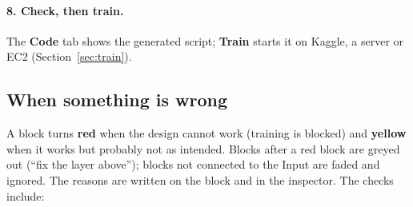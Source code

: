 \documentclass[11pt,a4paper]{article}
\newcommand{\ui}[1]{\textbf{\textsf{#1}}}
\begin{document}
\paragraph{8. Check, then train.}
The \ui{Code} tab shows the generated script; \ui{Train} starts it on Kaggle, a server or EC2 (Section~\ref{sec:train}).

\subsection{When something is wrong}
\label{sec:checks}
A block turns \textbf{red} when the design cannot work (training is blocked) and \textbf{yellow} when it works but probably not as
intended. Blocks after a red block are greyed out (``fix the layer above''); blocks not connected to the Input are faded and ignored.
The reasons are written on the block and in the inspector. The checks include:
\end{document}
